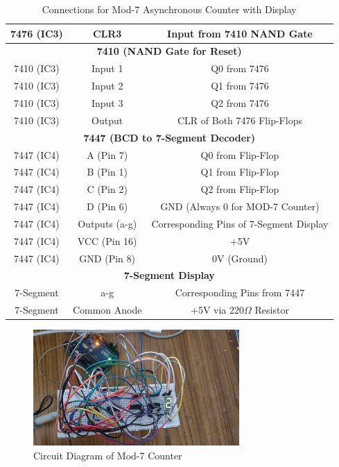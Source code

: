 \documentclass[12pt,a4paper]{article}
\begin{document}
\begin{table}[H]
\begin{tabular}{|c|c|c|}
        7476 (IC3) & CLR3 & Input from 7410 NAND Gate\\
        \hline
        \multicolumn{3}{|c|}{\textbf{7410 (NAND Gate for Reset)}} \\
        \hline
        7410 (IC3) & Input 1 & Q0 from 7476 \\
        7410 (IC3) & Input 2 & Q1 from 7476 \\
        7410 (IC3) & Input 3 & Q2 from 7476 \\
        7410 (IC3) & Output & CLR of Both 7476 Flip-Flops \\
        \hline
        \multicolumn{3}{|c|}{\textbf{7447 (BCD to 7-Segment Decoder)}} \\
        \hline
        7447 (IC4) & A (Pin 7) & Q0 from Flip-Flop \\
        7447 (IC4) & B (Pin 1) & Q1 from Flip-Flop \\
        7447 (IC4) & C (Pin 2) & Q2 from Flip-Flop \\
        7447 (IC4) & D (Pin 6) & GND (Always 0 for MOD-7 Counter) \\
        7447 (IC4) & Outputs (a-g) & Corresponding Pins of 7-Segment Display \\
        7447 (IC4) & VCC (Pin 16) & +5V \\
        7447 (IC4) & GND (Pin 8) & 0V (Ground) \\
        \hline
        \multicolumn{3}{|c|}{\textbf{7-Segment Display}} \\
        \hline
        7-Segment & a-g & Corresponding Pins from 7447 \\
        7-Segment & Common Anode & +5V via 220$\Omega$ Resistor \\
        \hline
    \end{tabular}
    \caption{Connections for Mod-7 Asynchronous Counter with Display}
    \label{tab:circuit}
\end{table}
\begin{figure}[H]
    \centering
    \includegraphics[width=0.7\textwidth]{figs/Circuit.jpeg} %
    \caption{Circuit Diagram of Mod-7 Counter}
\end{figure}
\end{document}

